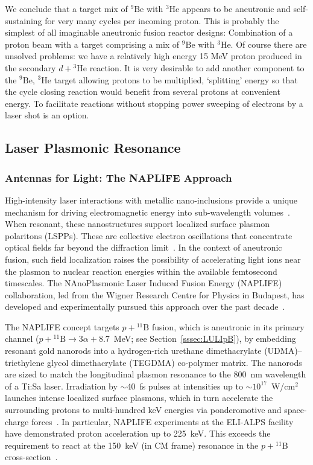\documentclass[particles,article,accept,pdftex,moreauthors]{Definitions/mdpi}
\newcommand{\rsec}[1]{Section~\ref{#1}}
\begin{document}
We conclude that a target mix of ${}^9\mathrm{Be}$ with ${}^{3}\mathrm{He}$ appears to be aneutronic and self-sustaining for very many cycles per incoming proton. This is probably the simplest of all imaginable aneutronic fusion reactor designs: Combination of a proton beam with a target comprising a mix of ${}^9\mathrm{Be}$ with ${}^{3}\mathrm{He}$. Of course there are unsolved problems: we have a relatively high energy 15 MeV proton produced in the secondary $d+{}^{3}\mathrm{He}$ reaction. It is very desirable to add another component to the ${}^9\mathrm{Be}$, ${}^{3}\mathrm{He}$ target allowing protons to be multiplied, `splitting' energy so that the cycle closing reaction would benefit from several protons at convenient energy. To facilitate reactions without stopping power sweeping of electrons by a laser shot is an option.
 
\subsection{Laser Plasmonic Resonance}\label{ssec:Plasmonics}
\subsubsection{Antennas for Light: The NAPLIFE Approach}\label{sssec:Anten}
High-intensity laser interactions with metallic nano-inclusions provide a unique mechanism for driving electromagnetic energy into sub-wavelength volumes~\cite{kroo2016plasmonic}. When resonant, these nanostructures support localized surface plasmon polaritons (LSPPs). These are collective electron oscillations that concentrate optical fields far beyond the diffraction limit~\cite{Schuck:2005,Novotny:2007,Novotny:2011}. In the context of aneutronic fusion, such field localization raises the possibility of accelerating light ions near the plasmon to nuclear reaction energies within the available femtosecond timescales. The NAnoPlasmonic Laser Induced Fusion Energy (NAPLIFE) collaboration, led from the Wigner Research Centre for Physics in Budapest, has developed and experimentally pursued this approach over the past decade~\cite{Biro:2025EPJ,Csernai:2025EPJ,tamas2025nanofusion}.

The NAPLIFE concept targets $p+{}^{11}\mathrm{B}$ fusion, which is aneutronic in its primary channel ($p+{}^{11}\mathrm{B}\to 3\alpha + 8.7$~MeV; see \rsec{sssec:LULIpB}), by embedding resonant gold nanorods into a hydrogen-rich urethane dimethacrylate (UDMA)--triethylene glycol dimethacrylate (TEGDMA) co-polymer matrix. The nanorods are sized to match the longitudinal plasmon resonance to the 800~nm wavelength of a Ti:Sa laser. Irradiation by $\sim$40~fs pulses at intensities up to ${\sim}10^{17}$~W/cm${}^2$ launches intense localized surface plasmons, which in turn accelerate the surrounding protons to multi-hundred keV energies via ponderomotive and space-charge forces~\cite{Papp:2022PRXEnergy,Papp:2023FrontPhys}. In particular, NAPLIFE experiments at the ELI-ALPS facility have demonstrated proton acceleration up to 225~keV. This exceeds the requirement to react at the 150~keV (in CM frame) resonance in the $p+{}^{11}$B cross-section~\cite{Kroo2024pB,Kedves:2025EPJ}.
\end{document}
